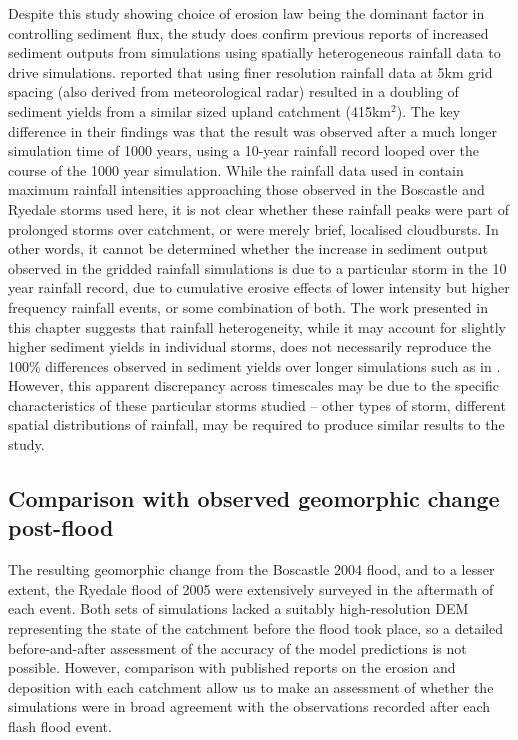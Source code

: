 Despite this study showing choice of erosion law being the dominant factor in controlling sediment flux, the study does confirm previous reports of increased sediment outputs from simulations using spatially heterogeneous rainfall data to drive simulations. \citet{coulthard2016sensitivity} reported that using finer resolution rainfall data at 5km grid spacing (also derived from meteorological radar) resulted in a doubling of sediment yields from a similar sized upland catchment (415km\(^2\)). The key difference in their findings was that the result was observed after a much longer simulation time of 1000 years, using a 10-year rainfall record looped over the course of the 1000 year simulation. While the rainfall data used in \citet{coulthard2016sensitivity} contain maximum rainfall intensities approaching those observed in the Boscastle and Ryedale storms used here, it is not clear whether these rainfall peaks were part of prolonged storms over catchment, or were merely brief, localised cloudbursts. In other words, it cannot be determined whether the increase in sediment output observed in the \citet{coulthard2016sensitivity} gridded rainfall simulations is due to a particular storm in the 10 year rainfall record, due to cumulative erosive effects of lower intensity but higher frequency rainfall events, or some combination of both. The work presented in this chapter suggests that rainfall heterogeneity, while it may account for slightly higher sediment yields in individual storms, does not necessarily reproduce the 100\% differences observed in sediment yields over longer simulations such as in \citet{coulthard2016sensitivity}. However, this apparent discrepancy across timescales may be due to the specific characteristics of these particular storms studied -- other types of storm, different spatial distributions of rainfall, may be required to produce similar results to the \citet{coulthard2016sensitivity} study. 

\subsection{Comparison with observed geomorphic change post-flood}

The resulting geomorphic change from the Boscastle 2004 flood, and to a lesser extent, the Ryedale flood of 2005 were extensively surveyed in the aftermath of each event. Both sets of simulations lacked a suitably high-resolution DEM representing the state of the catchment before the flood took place, so a detailed before-and-after assessment of the accuracy of the model predictions is not possible. However, comparison with published reports on the erosion and deposition with each catchment allow us to make an assessment of whether the simulations were in broad agreement with the observations recorded after each flash flood event.

